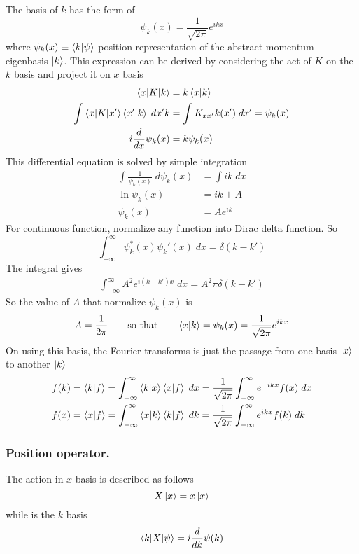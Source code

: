 \documentclass[../main.tex]{subfiles}
\begin{document}
The basis of $k$ has the form of 
\begin{equation*}
	\psi_k(x)=\frac{1 }{\sqrt{2\pi}}e^{ikx}
\end{equation*}
where $\psi_k(x)\equiv \braket{k|\psi}$ position representation of the abstract momentum eigenbasis $\ket{k}$.
This expression can be derived by considering the act of $K$ on the $k$ basis and project it on $x$ basis
\begin{align*}
	\braket{x|K|k}&=k\braket{x|k}\\
	\int \braket{x|K|x'}\braket{x'|k}\;dx'k &=\int K_{xx'}k(x')\;dx'=\psi_k(x)\\
	i\frac{d }{dx }\psi_k(x )&=k \psi_k(x)\\
\end{align*}
This differential equation is solved by simple integration
\begin{align*}
	\int \frac{1 }{\psi_k(x)}\;d\psi_k(x)&=\int ik\;dx\\
	\ln \psi_k(x)&=ik+A\\
	\psi_k(x)&=Ae^{ik}
\end{align*}
For continuous function, normalize any function into Dirac delta function.
So
\begin{equation*}
	\int_{-\infty}^{\infty} \psi_k ^*(x) \psi_k' (x)\;dx=\delta(k-k')
\end{equation*}
The integral gives 
\begin{align*}
	\int_{-\infty}^{\infty} A^2e^{i(k-k')x}\;dx=A^2\pi \delta(k-k')
\end{align*}
So the value of $A$ that normalize $\psi_k(x)$ is 
\begin{equation*}
	A=\frac{1 }{2\pi}\qquad\text{so that}\qquad \braket{x|k}=\psi_k(x)=\frac{1 }{\sqrt{2\pi}}e^{ikx}
\end{equation*}
On using this basis, the Fourier transforms is just the passage from one basis $\ket{x}$ to another $\ket{k}$
\begin{align*}
	f(k)&=\braket{k|f}=\int_{-\infty}^{\infty} \braket{k|x}\braket{x|f}\;dx=\frac{1 }{\sqrt{2\pi}}\int_{-\infty}^{\infty} e^{-ikx} f(x)\;dx\\
	f(x)&=\braket{x|f}=\int_{-\infty}^{\infty} \braket{x|k}\braket{k|f}\;dk=\frac{1 }{\sqrt{2\pi}}\int_{-\infty}^{\infty} e^{ikx} f(k)\;dk\\
\end{align*}

\subsubsection{Position operator.}
The action in $x$ basis is described as follows
\begin{equation*}
	X \ket{x}=x \ket{x}
\end{equation*}
while is the $k$ basis
\begin{equation*}
	\braket{k|X|\psi}=i \frac{d }{dk}\psi(k)
\end{equation*}
\end{document}
